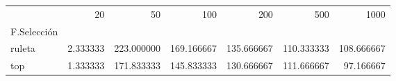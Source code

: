 \begin{tabular}{lrrrrrr}
\toprule
{} &      20   &        50   &        100  &        200  &        500  &        1000 \\
F.Selección &           &             &             &             &             &             \\
\midrule
ruleta      &  2.333333 &  223.000000 &  169.166667 &  135.666667 &  110.333333 &  108.666667 \\
top         &  1.333333 &  171.833333 &  145.833333 &  130.666667 &  111.666667 &   97.166667 \\
\bottomrule
\end{tabular}
